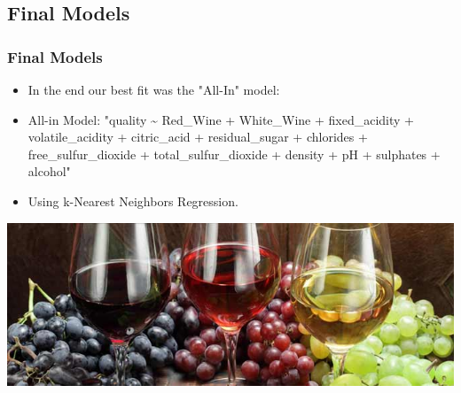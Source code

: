 \documentclass{beamer}
\begin{document}
	\subsection{Final Models}
	\begin{frame}
		\frametitle{Final Models}
		\begin{itemize}
			\item In the end our best fit was the "All-In" model:
			\item All-in Model:  "quality \~{} Red\_Wine + White\_Wine + fixed\_acidity + volatile\_acidity + citric\_acid + residual\_sugar + chlorides + free\_sulfur\_dioxide + total\_sulfur\_dioxide + density + pH + sulphates + alcohol"
			\item Using k-Nearest Neighbors Regression.  
		\end{itemize}
	\includegraphics[width=\textwidth]{images/wine and grapes.jpg}
	\end{frame}
	
\end{document}
